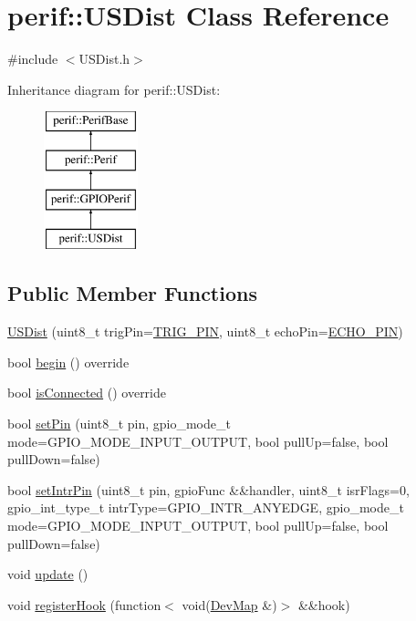 \hypertarget{classperif_1_1USDist}{}\section{perif\+::U\+S\+Dist Class Reference}
\label{classperif_1_1USDist}


{\ttfamily \#include $<$U\+S\+Dist.\+h$>$}

Inheritance diagram for perif\+::U\+S\+Dist\+:\begin{figure}[H]
\begin{center}
\leavevmode
\includegraphics[height=4.000000cm]{classperif_1_1USDist}
\end{center}
\end{figure}
\subsection*{Public Member Functions}
\begin{DoxyCompactItemize}
\item 
\mbox{\hyperlink{classperif_1_1USDist_a56e837dd1ef2de47ae628f56f241ad04}{U\+S\+Dist}} (uint8\+\_\+t trig\+Pin=\mbox{\hyperlink{USDist_8h_a8eab89acd7dcb0e77e7b00d1749022a6}{T\+R\+I\+G\+\_\+\+P\+IN}}, uint8\+\_\+t echo\+Pin=\mbox{\hyperlink{USDist_8h_acea96cea4a13b6cb38e57a86788adf90}{E\+C\+H\+O\+\_\+\+P\+IN}})
\item 
bool \mbox{\hyperlink{classperif_1_1USDist_a0920535901e083c9832dcde3639ab569}{begin}} () override
\item 
bool \mbox{\hyperlink{classperif_1_1GPIOPerif_ae7c93b409fd4d4d49f9f8eddae612b3e}{is\+Connected}} () override
\item 
bool \mbox{\hyperlink{classperif_1_1GPIOPerif_a4edf4acd2bcdbe870efb96f8dcd7940a}{set\+Pin}} (uint8\+\_\+t pin, gpio\+\_\+mode\+\_\+t mode=G\+P\+I\+O\+\_\+\+M\+O\+D\+E\+\_\+\+I\+N\+P\+U\+T\+\_\+\+O\+U\+T\+P\+UT, bool pull\+Up=false, bool pull\+Down=false)
\item 
bool \mbox{\hyperlink{classperif_1_1GPIOPerif_a9e1f4a1d4aa01d0bc01d9a371a52dd5c}{set\+Intr\+Pin}} (uint8\+\_\+t pin, gpio\+Func \&\&handler, uint8\+\_\+t isr\+Flags=0, gpio\+\_\+int\+\_\+type\+\_\+t intr\+Type=G\+P\+I\+O\+\_\+\+I\+N\+T\+R\+\_\+\+A\+N\+Y\+E\+D\+GE, gpio\+\_\+mode\+\_\+t mode=G\+P\+I\+O\+\_\+\+M\+O\+D\+E\+\_\+\+I\+N\+P\+U\+T\+\_\+\+O\+U\+T\+P\+UT, bool pull\+Up=false, bool pull\+Down=false)
\item 
void \mbox{\hyperlink{classperif_1_1Perif_ad6fe1a13354bba4af4cc2751399ed93c}{update}} ()
\item 
void \mbox{\hyperlink{classperif_1_1PerifBase_a2e8bcc221ee253b21b61c7c07307d931}{register\+Hook}} (function$<$ void(\mbox{\hyperlink{Perif_8hpp_a358ff4ee6d24694ee7661f0cce14377e}{Dev\+Map}} \&)$>$ \&\&hook)
\end{DoxyCompactItemize}
